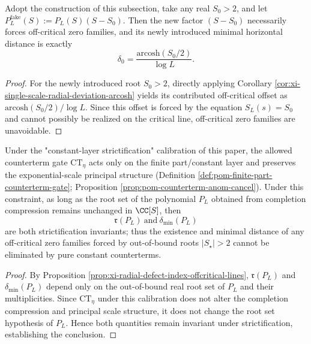 \begin{corollary}\label{cor:xi-fake-factor-forces-offcritical-distance}
Adopt the construction of this subsection, take any real \(S_0>2\), and let
\(
P^{\mathrm{fake}}_L(S):=P_L(S)(S-S_0)
\).
Then the new factor \((S-S_0)\) necessarily forces off-critical zero families, and its newly introduced minimal horizontal distance is exactly
\[
\delta_0=\frac{\mathrm{arcosh}(S_0/2)}{\log L}.
\]
\end{corollary}

\begin{proof}
For the newly introduced root \(S_0>2\), directly applying Corollary \ref{cor:xi-single-scale-radial-deviation-arcosh} yields its contributed off-critical offset as \(\mathrm{arcosh}(S_0/2)/\log L\).
Since this offset is forced by the equation \(S_L(s)=S_0\) and cannot possibly be realized on the critical line, off-critical zero families are unavoidable.
\end{proof}

\begin{proposition}\label{prop:xi-radial-defect-index-counterterm-invariant}
Under the "constant-layer strictification" calibration of this paper, the allowed counterterm gate \(\mathrm{CT}_\eta\) acts only on the finite part/constant layer and preserves the exponential-scale principal structure (Definition \ref{def:pom-finite-part-counterterm-gate}; Proposition \ref{prop:pom-counterterm-anom-cancel}).
Under this constraint, as long as the root set of the polynomial \(P_L\) obtained from completion compression remains unchanged in \(\CC[S]\), then
\[
\mathfrak r(P_L)\ \text{and}\ \delta_{\min}(P_L)
\]
are both strictification invariants; thus the existence and minimal distance of any off-critical zero families forced by out-of-bound roots \(|S_\star|>2\) cannot be eliminated by pure constant counterterms.
\end{proposition}

\begin{proof}
By Proposition \ref{prop:xi-radial-defect-index-offcritical-lines}, \(\mathfrak r(P_L)\) and \(\delta_{\min}(P_L)\) depend only on the out-of-bound real root set of \(P_L\) and their multiplicities.
Since \(\mathrm{CT}_\eta\) under this calibration does not alter the completion compression and principal scale structure, it does not change the root set hypothesis of \(P_L\).
Hence both quantities remain invariant under strictification, establishing the conclusion.
\end{proof}

